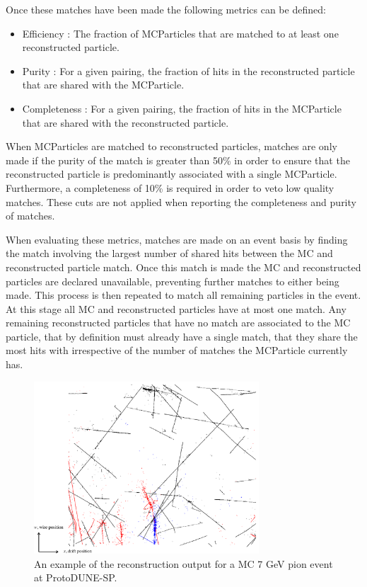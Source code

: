 Once these matches have been made the following metrics can be defined:

\begin{itemize}
    \item Efficiency : The fraction of MCParticles that are matched to at least one reconstructed particle.
    \item Purity : For a given pairing, the fraction of hits in the reconstructed particle that are shared with the MCParticle.
    \item Completeness : For a given pairing, the fraction of hits in the MCParticle that are shared with the reconstructed particle.
\end{itemize}

When MCParticles are matched to reconstructed particles, matches are only made if the purity of the match is greater than 50\% in order to ensure that the reconstructed particle is predominantly associated with a single MCParticle.  Furthermore, a completeness of 10\% is required in order to veto low quality matches.  These cuts are not applied when reporting the completeness and purity of matches.  

When evaluating these metrics, matches are made on an event basis by finding the match involving the largest number of shared hits between the MC and reconstructed particle match.  Once this match is made the MC and reconstructed particles are declared unavailable, preventing further matches to either being made.  This process is then repeated to match all remaining particles in the event.  At this stage all MC and reconstructed particles have at most one match.  Any remaining reconstructed particles that have no match are associated to the MC particle, that by definition must already have a single match, that they share the most hits with irrespective of the number of matches the MCParticle currently has.

\begin{figure}
\includegraphics[width=0.75\textwidth]{Figures/EventDisplays/MC/EventComposition.pdf} 
\caption{An example of the reconstruction output for a MC 7 GeV pion event at ProtoDUNE-SP.}
\label{fig:1b}
\end{figure}

